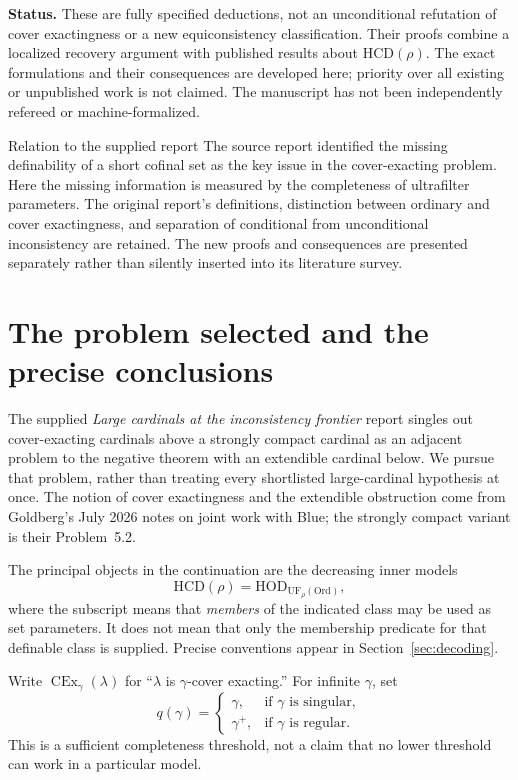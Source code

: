 \documentclass[11pt,letterpaper]{article}
\theoremstyle{definition}
\newcommand{\HOD}{\mathrm{HOD}}
\newcommand{\CEx}{\operatorname{CEx}}
\newcommand{\Ord}{\mathrm{Ord}}
\newcommand{\HCD}{\mathrm{HCD}}
\newcommand{\UF}{\mathrm{UF}}
\begin{document}
\textbf{Status.} These are fully specified deductions, not an unconditional refutation of cover exactingness or a new equiconsistency classification. Their proofs combine a localized recovery argument with published results about $\HCD(\rho)$. The exact formulations and their consequences are developed here; priority over all existing or unpublished work is not claimed. The manuscript has not been independently refereed or machine-formalized.

\clearpage
\tableofcontents
\vspace{8pt}
\begin{assessment}{Relation to the supplied report}
The source report identified the missing definability of a short cofinal set as the key issue in the cover-exacting problem. Here the missing information is measured by the completeness of ultrafilter parameters. The original report's definitions, distinction between ordinary and cover exactingness, and separation of conditional from unconditional inconsistency are retained. The new proofs and consequences are presented separately rather than silently inserted into its literature survey.
\end{assessment}

\clearpage
\section{The problem selected and the precise conclusions}\label{sec:results}

The supplied \emph{Large cardinals at the inconsistency frontier} report singles out cover-exacting cardinals above a strongly compact cardinal as an adjacent problem to the negative theorem with an extendible cardinal below. We pursue that problem, rather than treating every shortlisted large-cardinal hypothesis at once. The notion of cover exactingness and the extendible obstruction come from Goldberg's July 2026 notes on joint work with Blue; the strongly compact variant is their Problem~5.2.\cite{source,cover}

The principal objects in the continuation are the decreasing inner models
\[
   \HCD(\rho)=\HOD_{\UF_\rho(\Ord)},
\]
where the subscript means that \emph{members} of the indicated class may be used as set parameters. It does not mean that only the membership predicate for that definable class is supplied. Precise conventions appear in Section~\ref{sec:decoding}.

Write $\CEx_\gamma(\lambda)$ for ``$\lambda$ is $\gamma$-cover exacting.'' For infinite $\gamma$, set
\begin{equation}\label{eq:threshold}
 q(\gamma)=
 \begin{cases}
   \gamma,&\text{if $\gamma$ is singular},\\
   \gamma^+,&\text{if $\gamma$ is regular}.
 \end{cases}
\end{equation}
This is a sufficient completeness threshold, not a claim that no lower threshold can work in a particular model.
\end{document}
